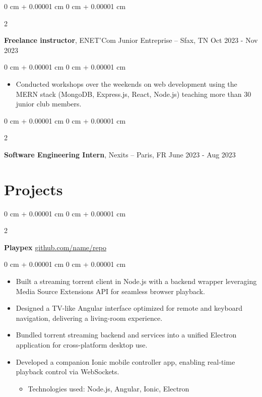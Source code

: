 \documentclass[10pt, letterpaper]{article}
\newenvironment{highlights}{
  \begin{itemize}[
    topsep=0.10 cm,
    parsep=0.10 cm,
    partopsep=0pt,
    itemsep=0pt,
    leftmargin=0 cm + 10pt
    ]
  }{
\end{itemize}
}
\newenvironment{highlightsforbulletentries}{
  \begin{itemize}[
    topsep=0.10 cm,
    parsep=0.10 cm,
    partopsep=0pt,
    itemsep=0pt,
    leftmargin=10pt
    ]
  }{
\end{itemize}
} %
\newenvironment{onecolentry}{
  \begin{adjustwidth}{
      0 cm + 0.00001 cm
    }{
      0 cm + 0.00001 cm
    }
  }{
  \end{adjustwidth}
} %
\newenvironment{twocolentry}[2][]{
  \onecolentry
  \def\secondColumn{#2}
  \setcolumnwidth{\fill, 4.5 cm}
  \begin{paracol}{2}
  }{
    \switchcolumn \raggedleft \secondColumn
  \end{paracol}
  \end{onecolentry}
} %
\begin{document}
    \begin{twocolentry}{
      Oct 2023 - Nov 2023
    }
  \textbf{Freelance instructor}, ENET’Com Junior Entreprise  -- Sfax, TN\end{twocolentry}

  \vspace{0.10 cm}
  \begin{onecolentry}
    \begin{highlights}

    \item Conducted workshops over the weekends on web development using the MERN stack (MongoDB, Express.js, React, Node.js) teaching more than 30 junior club members.


    \end{highlights}

  \end{onecolentry}




  \begin{twocolentry}{
      June 2023 - Aug 2023
    }
  \textbf{Software Engineering Intern}, Nexits  -- Paris, FR\end{twocolentry}

  \vspace{0.10 cm}

  \section{Projects}


  \vspace{0.2 cm}

  \begin{twocolentry}{
      \href{https://github.com/sinaatalay/rendercv}{github.com/name/repo}
    }
  \textbf{Playpex}\end{twocolentry}

  \vspace{0.10 cm}
  \begin{onecolentry}
    \begin{highlights}
\item Built a streaming torrent client in Node.js with a backend wrapper leveraging Media Source Extensions API for seamless browser playback.
\item Designed a TV-like Angular interface optimized for remote and keyboard navigation, delivering a living-room experience.
\item Bundled torrent streaming backend and services into a unified Electron application for cross-platform desktop use.
\item Developed a companion Ionic mobile controller app, enabling real-time playback control via WebSockets.

                \begin{highlightsforbulletentries}
    \item Technologies used: Node.js, Angular, Ionic, Electron
    \end{highlightsforbulletentries}

    \end{highlights}
  \end{onecolentry}
\end{document}
